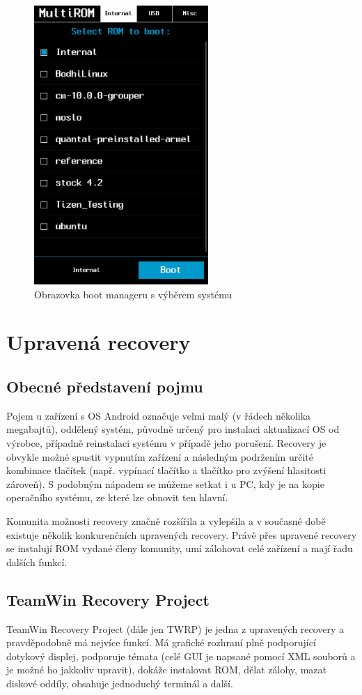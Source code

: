 \documentclass[12pt, a4paper, oneside]{article}
\begin{document}
\begin{figure}[H]
\begin{center}
 \includegraphics[width=250px]{img/boot_manager.png}
\caption{Obrazovka boot manageru s výběrem systému}
\end{center}
\end{figure}


\section{Upravená recovery}
\subsection{Obecné představení pojmu}
Pojem  u zařízení s OS Android označuje velmi malý (v řádech několika megabajtů), oddělený systém, původně určený pro instalaci aktualizací OS od výrobce, případně reinstalaci systému v případě jeho porušení. Recovery je obvykle možné spustit vypnutím zařízení a následným podržením určité kombinace tlačítek (např. vypínací tlačítko a tlačítko pro zvýšení hlasitosti zároveň). S podobným nápadem se můžeme setkat i u PC, kdy je na  kopie operačního systému, ze které lze obnovit ten hlavní.

Komunita možnosti recovery značně rozšířila a vylepšila a v současné době existuje několik konkurenčních upravených recovery. Právě přes upravené recovery se instalují ROM vydané členy komunity, umí zálohovat celé zařízení a mají řadu dalších funkcí.

\subsection{TeamWin Recovery Project}
TeamWin Recovery Project\cite{twrp} (dále jen TWRP) je jedna z upravených recovery a pravděpodobně má nejvíce funkcí. Má grafické rozhraní plně podporující dotykový displej, podporuje témata (celé GUI je napsané pomocí XML souborů a je možné ho jakkoliv upravit), dokáže instalovat ROM, dělat zálohy, mazat diskové oddíly, obsahuje jednoduchý terminál a další.
\end{document}
